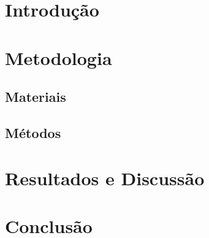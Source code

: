 \documentclass[12pt,oneside,a4paper,english,brazil]{abntex2} %
\begin{document}
\textual                %


\chapter{Introdução}
\lipsum[1-3]



\chapter{Metodologia}
\lipsum[4-6]



\section{Materiais}
\lipsum[7-9]



\section{Métodos}
\lipsum[10-12]



\chapter{Resultados e Discussão}
\lipsum[13-15]



\chapter{Conclusão}
\lipsum[16-18]



\end{document}
